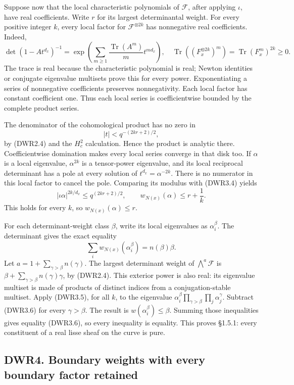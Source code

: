Suppose now that the local characteristic polynomials of \(\mathcal F\),
after applying \(\iota\), have real coefficients. Write \(r\) for its
largest determinantal weight. For every positive integer \(k\), every
local factor for \(\mathcal F^{\otimes2k}\) has nonnegative real
coefficients. Indeed, \[
\det(1-At^{d_x})^{-1}
=\exp\left(\sum_{m\ge1}\frac{\operatorname{Tr}(A^m)}m t^{md_x}\right),
\quad
\operatorname{Tr}((F_x^{\otimes2k})^m)=\operatorname{Tr}(F_x^m)^{2k}\ge0.
\tag{DWR3.3}
\] The trace is real because the characteristic polynomial is real;
Newton identities or conjugate eigenvalue multisets prove this for every
power. Exponentiating a series of nonnegative coefficients preserves
nonnegativity. Each local factor has constant coefficient one. Thus each
local series is coefficientwise bounded by the complete product series.

The denominator of the cohomological product has no zero in \[
|t|<q^{-(2kr+2)/2},
\tag{DWR3.4}
\] by (DWR2.4) and the \(H_c^2\) calculation. Hence the product is
analytic there. Coefficientwise domination makes every local series
converge in that disk too. If \(\alpha\) is a local eigenvalue,
\(\alpha^{2k}\) is a tensor-power eigenvalue, and its local reciprocal
determinant has a pole at every solution of \(t^{d_x}=\alpha^{-2k}\).
There is no numerator in this local factor to cancel the pole. Comparing
its modulus with (DWR3.4) yields \[
|\iota\alpha|^{2k/d_x}\le q^{(2kr+2)/2},
\qquad w_{N(x)}(\alpha)\le r+\frac1k.
\tag{DWR3.5}
\] This holds for every \(k\), so \(w_{N(x)}(\alpha)\le r\).

For each determinant-weight class \(\beta\), write its local eigenvalues
as \(\alpha_i^\beta\). The determinant gives the exact equality \[
\sum_i w_{N(x)}(\alpha_i^\beta)=n(\beta)\beta.
\tag{DWR3.6}
\] Let \(a=1+\sum_{\gamma>\beta}n(\gamma)\). The largest determinant
weight of \(\bigwedge^a\mathcal F\) is
\(\beta+\sum_{\gamma>\beta}n(\gamma)\gamma\), by (DWR2.4). This exterior
power is also real: its eigenvalue multiset is made of products of
distinct indices from a conjugation-stable multiset. Apply (DWR3.5), for
all \(k\), to the eigenvalue
\(\alpha_i^\beta\prod_{\gamma>\beta}\prod_j\alpha_j^\gamma\). Subtract
(DWR3.6) for every \(\gamma>\beta\). The result is
\(w(\alpha_i^\beta)\le\beta\). Summing those inequalities gives equality
(DWR3.6), so every inequality is equality. This proves §1.5.1: every
constituent of a real lisse sheaf on the curve is pure.

\subsection{DWR4. Boundary weights with every boundary factor
retained}\label{dwr4.-boundary-weights-with-every-boundary-factor-retained}

